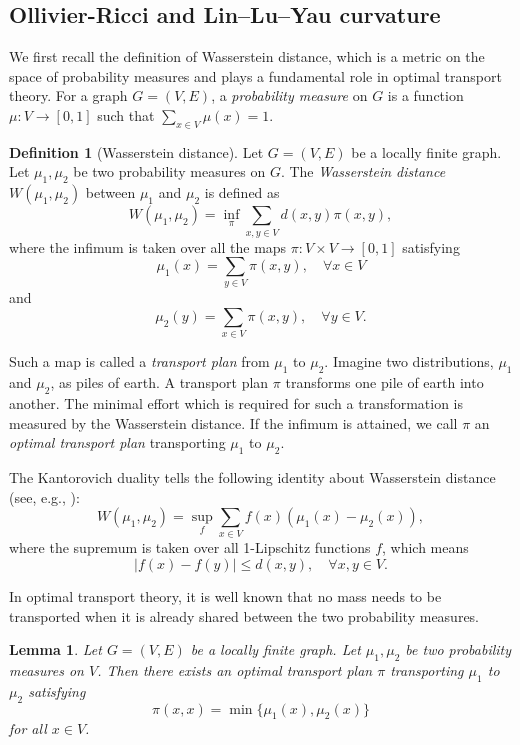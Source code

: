 \documentclass[10pt,a4paper]{article}
\newtheorem{lemma}{Lemma}[section]
\theoremstyle{definition}
\newtheorem{defi}{Definition}[section]
\theoremstyle{definition}
\theoremstyle{nonumber}
\begin{document}
\subsection{Ollivier-Ricci and Lin--Lu--Yau curvature}\label{Lin--Lu--Yau curvature}

We first recall the definition of Wasserstein distance, which is a metric on the space of probability measures and plays a fundamental role in optimal transport theory.
For a graph $G = (V, E)$, a \textit{probability measure} on $G$ is a function $\mu : V \to [0, 1]$ such that $\sum_{x \in V} \mu(x) = 1$.

\begin{defi}[Wasserstein distance] 
Let $G = (V, E)$ be a locally finite graph. Let $\mu_1, \mu_2$ be two probability measures on $G$. The \textit{Wasserstein distance} $W(\mu_1, \mu_2)$ between $\mu_1$ and $\mu_2$ is defined as
$$
W(\mu_1, \mu_2) = \inf_{\pi} \sum_{x, y \in V} d(x, y) \pi(x, y),
$$
where the infimum is taken over all the maps $\pi : V \times V \to [0, 1]$ satisfying
$$
\mu_1(x) = \sum_{y \in V} \pi(x, y), \quad \forall x \in V
$$
and
$$
\mu_2(y) = \sum_{x \in V} \pi(x, y), \quad \forall y \in V.
$$
\end{defi}

Such a map is called a \textit{transport plan} from $\mu_1$ to $\mu_2$.
Imagine two distributions, $\mu_1$ and $\mu_2$, as piles of earth. A transport plan $\pi$ transforms one pile of earth into another. The minimal effort which is required for such a transformation is measured by the Wasserstein distance. If the infimum is attained, we call $\pi$ an \textit{optimal transport plan} transporting $\mu_1$ to $\mu_2$.

The Kantorovich duality tells the following identity about Wasserstein distance (see, e.g., \cite[Theorem 1.14]{Villani}):
$$
W(\mu_1, \mu_2) = \sup_f \sum_{x \in V} f(x) (\mu_1(x) - \mu_2(x)),
$$
where the supremum is taken over all 1-Lipschitz functions $f$, which means 
$$
|f(x) - f(y)| \leq d(x, y), \quad \forall x, y \in V.
$$

In optimal transport theory, it is well known that no mass needs to be transported when it is already shared between the two probability measures.

\begin{lemma}\label{simple transport plan}   
Let $G = (V, E)$ be a locally finite graph. Let $\mu_1, \mu_2$ be two probability measures on $V$. Then there exists an optimal transport plan $\pi$ transporting $\mu_1$ to $\mu_2$ satisfying
$$
\pi(x, x) = \min\{\mu_1(x), \mu_2(x)\}
$$
for all $x \in V$.
\end{lemma}
\end{document}
